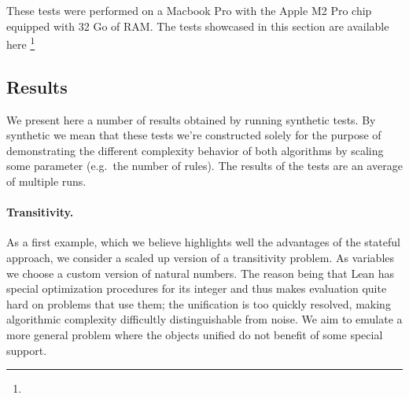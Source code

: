 \documentclass[runningheads]{llncs}
\newcommand{\xcom}[1]{{\color{cyan}{Xavier: #1}} }
\begin{document}
These tests were performed on a Macbook Pro with the Apple M2 Pro chip equipped with 32 Go of RAM.
The tests showcased in this section are available here \footnote{\xcom{TODO : Link Github repo with tests.}}
\subsection{Results}
\xcom{TODO: Add a comment on the effect it had on Mathlib.}

We present here a number of results obtained by running synthetic tests.
By synthetic we mean that these tests we're constructed solely for the purpose of demonstrating the different complexity behavior of both algorithms by scaling some parameter (e.g.\ the number of rules).
The results of the tests are an average of multiple runs.

\paragraph{Transitivity.}

\begin{figure}
    \label{fig:trans}
    \end{figure}

As a first example, which we believe highlights well the advantages of the stateful approach, we consider a scaled up version of a transitivity problem.
As variables we choose a custom version of natural numbers.
The reason being that Lean has special optimization procedures for its integer and thus makes evaluation quite hard on problems that use them; the unification is too quickly resolved, making algorithmic complexity difficultly distinguishable from noise.
We aim to emulate a more general problem where the objects unified do not benefit of some special support.
\end{document}
